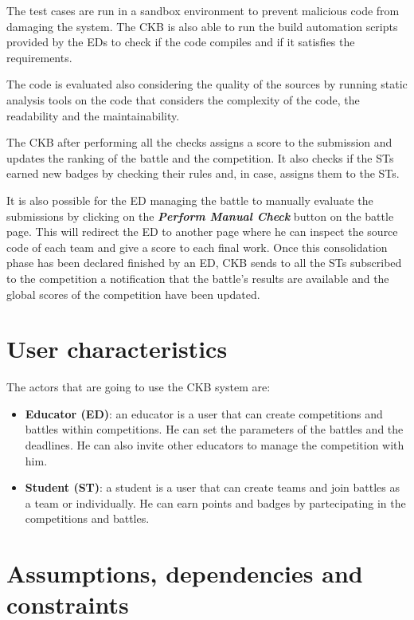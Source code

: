 The test cases are run in a sandbox environment to prevent malicious code from damaging the system. The CKB is also able to run the build automation scripts provided by the EDs to check if the code compiles and if it satisfies the requirements. 

The code is evaluated also considering the quality of the sources by running static analysis tools on the code that considers the complexity of the code, the readability and the maintainability.

The CKB after performing all the checks assigns a score to the submission and updates the ranking of the battle and the competition. It also checks if the STs earned new badges by checking their rules and, in case, assigns them to the STs.

It is also possible for the ED managing the battle to manually evaluate the submissions by clicking on the \textbf{\textit{Perform Manual Check}} button on the battle page. This will redirect the ED to another page where he can inspect the source code of each team and give a score to each final work. Once this consolidation phase has been declared finished by an ED, CKB sends to all the STs subscribed to the competition a notification that the battle's results are available and the global scores of the competition have been updated.

\newpage

\section{User characteristics}
\label{s:User_characteristics}%

The actors that are going to use the CKB system are:
\begin{itemize}
  \item \textbf{Educator (ED)}: an educator is a user that can create competitions and battles within competitions. He can set the parameters of the battles and the deadlines. He can also invite other educators to manage the competition with him.
  \item \textbf{Student (ST)}: a student is a user that can create teams and join battles as a team or individually. He can earn points and badges by partecipating in the competitions and battles.
\end{itemize}


\section{Assumptions, dependencies and constraints}
\label{s:Assumptions_dependencies_and_constraints}%

